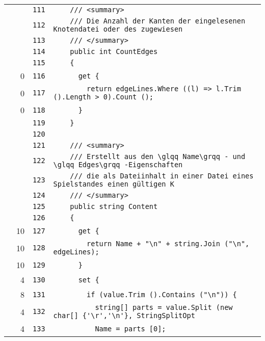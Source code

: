 \documentclass[a4paper,10pt]{article}
\begin{document}
\begin{longtable}[l]{lrrl}
\cellcolor{gray} &  & \verb~111~ & \verb~    /// <summary>~\\
\cellcolor{gray} &  & \verb~112~ & \verb~    /// Die Anzahl der Kanten der eingelesenen Knotendatei oder des zugewiesen~\\
\cellcolor{gray} &  & \verb~113~ & \verb~    /// </summary>~\\
\cellcolor{gray} &  & \verb~114~ & \verb~    public int CountEdges~\\
\cellcolor{gray} &  & \verb~115~ & \verb~    {~\\
\cellcolor{red} & 0 & \verb~116~ & \verb~      get {~\\
\cellcolor{red} & 0 & \verb~117~ & \verb~        return edgeLines.Where ((l) => l.Trim ().Length > 0).Count ();~\\
\cellcolor{red} & 0 & \verb~118~ & \verb~      }~\\
\cellcolor{gray} &  & \verb~119~ & \verb~    }~\\
\cellcolor{gray} &  & \verb~120~ & \verb~~\\
\cellcolor{gray} &  & \verb~121~ & \verb~    /// <summary>~\\
\cellcolor{gray} &  & \verb~122~ & \verb~    /// Erstellt aus den \glqq Name\grqq - und \glqq Edges\grqq -Eigenschaften~\\
\cellcolor{gray} &  & \verb~123~ & \verb~    /// die als Dateiinhalt in einer Datei eines Spielstandes einen gültigen K~\\
\cellcolor{gray} &  & \verb~124~ & \verb~    /// </summary>~\\
\cellcolor{gray} &  & \verb~125~ & \verb~    public string Content~\\
\cellcolor{gray} &  & \verb~126~ & \verb~    {~\\
\cellcolor{green} & 10 & \verb~127~ & \verb~      get {~\\
\cellcolor{green} & 10 & \verb~128~ & \verb~        return Name + "\n" + string.Join ("\n", edgeLines);~\\
\cellcolor{green} & 10 & \verb~129~ & \verb~      }~\\
\cellcolor{green} & 4 & \verb~130~ & \verb~      set {~\\
\cellcolor{green} & 8 & \verb~131~ & \verb~        if (value.Trim ().Contains ("\n")) {~\\
\cellcolor{green} & 4 & \verb~132~ & \verb~          string[] parts = value.Split (new char[] {'\r','\n'}, StringSplitOpt~\\
\cellcolor{green} & 4 & \verb~133~ & \verb~          Name = parts [0];~\\

\end{longtable}
\end{document}
